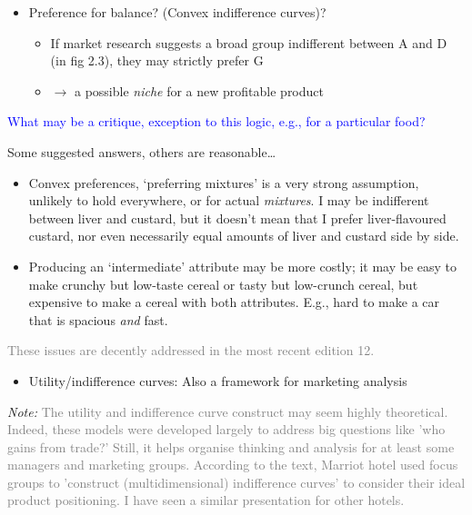 \documentclass[]{article}
\providecommand{\tightlist}{%
  \setlength{\itemsep}{0pt}\setlength{\parskip}{0pt}}
\begin{document}
\begin{itemize}
\tightlist
\item
  Preference for balance? (Convex indifference curves)?

  \begin{itemize}
  \tightlist
  \item
    If market research suggests a broad group indifferent between A and
    D (in fig 2.3), they may strictly prefer G
  \item
    \(\rightarrow\) a possible \emph{niche} for a new profitable product
  \end{itemize}
\end{itemize}

\textcolor{blue}{What may be a critique, exception to this logic, e.g., for a particular food?}

Some suggested answers, others are reasonable\ldots{}

\begin{itemize}
\item
  Convex preferences, `preferring mixtures' is a very strong assumption,
  unlikely to hold everywhere, or for actual \emph{mixtures}. I may be
  indifferent between liver and custard, but it doesn't mean that I
  prefer liver-flavoured custard, nor even necessarily equal amounts of
  liver and custard side by side.
\item
  Producing an `intermediate' attribute may be more costly; it may be
  easy to make crunchy but low-taste cereal or tasty but low-crunch
  cereal, but expensive to make a cereal with both attributes. E.g.,
  hard to make a car that is spacious \emph{and} fast.
\end{itemize}

\textcolor{gray}{These issues are decently addressed in the most recent edition 12.}

\begin{itemize}
\tightlist
\item
  Utility/indifference curves: Also a framework for marketing analysis
\end{itemize}

\emph{Note:}
\textcolor{gray}{The utility and indifference curve construct may seem highly theoretical. Indeed, these models were developed largely to address big questions like 'who gains from trade?'  Still, it helps organise thinking and analysis for at least some managers and marketing groups.  According to the text, Marriot hotel used focus groups to 'construct (multidimensional) indifference curves' to consider their ideal product positioning.
I have seen a similar presentation for other hotels.}
\end{document}
